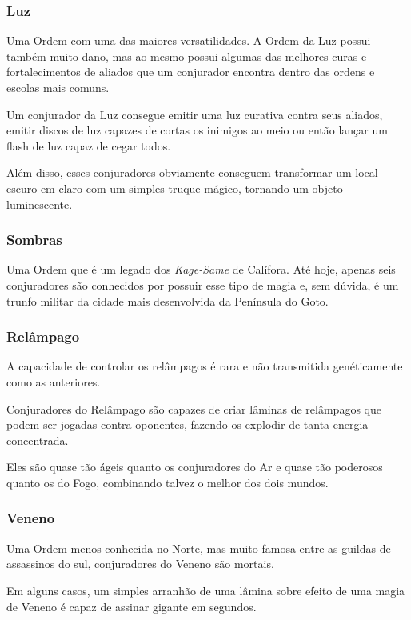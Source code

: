 \documentclass{RPG_Adventure}[2021/10/20]
\begin{document}
\begin{multicols}{2}
\subsubsection*{Luz}%

Uma Ordem com uma das maiores versatilidades. A Ordem da Luz possui também muito
dano, mas ao mesmo possui algumas das melhores curas e fortalecimentos de
aliados que um conjurador encontra dentro das ordens e escolas mais comuns.

Um conjurador da Luz consegue emitir uma luz curativa contra seus aliados,
emitir discos de luz capazes de cortas os inimigos ao meio ou então lançar um
flash de luz capaz de cegar todos.

Além disso, esses conjuradores obviamente conseguem transformar um local escuro
em claro com um simples truque mágico, tornando um objeto luminescente.

\subsubsection*{Sombras}%

Uma Ordem que é um legado dos \textit{Kage-Same} de Calífora. Até hoje, apenas
seis conjuradores são conhecidos por possuir esse tipo de magia e, sem dúvida, é
um trunfo militar da cidade mais desenvolvida da Península do Goto.

\subsubsection*{Relâmpago}%

A capacidade de controlar os relâmpagos é rara e não transmitida genéticamente
como as anteriores.

Conjuradores do Relâmpago são capazes de criar lâminas de relâmpagos que podem
ser jogadas contra oponentes, fazendo-os explodir de tanta energia concentrada.

Eles são quase tão ágeis quanto os conjuradores do Ar e quase tão poderosos
quanto os do Fogo, combinando talvez o melhor dos dois mundos.

\subsubsection*{Veneno}%

Uma Ordem menos conhecida no Norte, mas muito famosa entre as guildas de
assassinos do sul, conjuradores do Veneno são mortais.

Em alguns casos, um simples arranhão de uma lâmina sobre efeito de uma magia de
Veneno é capaz de assinar gigante em segundos.


\end{multicols}
\end{document}

